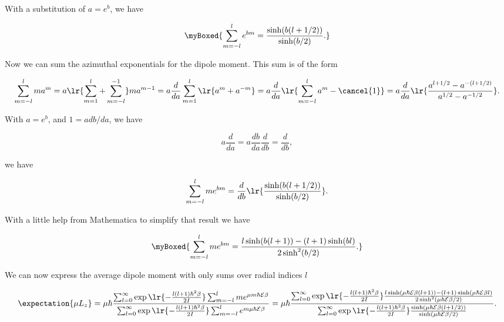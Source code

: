 {With a substitution of $a = e^b$, we have

\begin{equation}\label{eqn:basicStatMechProblemSet5Problem3:440}
\myBoxed{
\sum_{m = -l}^l e^{b m}
=
\frac{
\sinh(b(l + 1/2))
}
{
\sinh(b/2)
}.
}
\end{equation}

Now we can sum the azimuthal exponentials for the dipole moment.  This sum is of the form

\begin{dmath}\label{eqn:basicStatMechProblemSet5Problem3:460}
\sum_{m = -l}^l m a^m
= a 
\lr{ \sum_{m = 1}^l + \sum_{m = -l}^{-1} }
m a^{m-1}
= a 
\frac{d}{da}
\sum_{m = 1}^l
\lr{ a^{m} + a^{-m} }
= 
a 
\frac{d}{da}
\lr{ \sum_{m = -l}^l a^m - \cancel{1} }
= 
a 
\frac{d}{da}
\lr{ \frac{a^{l + 1/2} - a^{-(l+1/2)}}{a^{1/2} - a^{-1/2}} }.
\end{dmath}

With $a = e^{b}$, and $1 = a db/da$, we have

\begin{equation}\label{eqn:basicStatMechProblemSet5Problem3:480}
a \frac{d}{da} = a \frac{db}{da} \frac{d}{db} = \frac{d}{db},
\end{equation}

we have

\begin{equation}\label{eqn:basicStatMechProblemSet5Problem3:500}
\sum_{m = -l}^l m e^{b m}
= \frac{d}{db}
\lr{
\frac{
\sinh(b(l + 1/2))
}{
\sinh(b/2)
}
}.
\end{equation}

With a little help from Mathematica to simplify that result we have

\begin{equation}\label{eqn:basicStatMechProblemSet5Problem3:520}
\myBoxed{
\sum_{m = -l}^l m e^{b m}
=
\frac
{
l \sinh(b (l+1)) - (l+1) \sinh(b l) 
}
{
2 \sinh^2(b/2)
}
.
}
\end{equation}

We can now express the average dipole moment with only sums over radial indices $l$ 

\begin{dmath}\label{eqn:basicStatMechProblemSet5Problem3:540}
\expectation{ \mu L_z } 
= 
\mu \hbar 
\frac{
   \sum_{l = 0}^\infty \exp\lr{ -\frac{l (l+1) \hbar^2 \beta}{2 I}}
   \sum_{m = -l}^l m e^{ \mu m \hbar \mathcal{E} \beta}
}
{
   \sum_{l = 0}^\infty \exp\lr{ -\frac{l (l+1) \hbar^2 \beta}{2 I}} 
   \sum_{m = -l}^l e^{ m \mu \hbar \mathcal{E} \beta}
}
=
\mu \hbar
\frac
{
   \sum_{l = 0}^\infty \exp\lr{ -\frac{l (l+1) \hbar^2 \beta}{2 I}}
   \frac
   {
      l \sinh(\mu \hbar \mathcal{E} \beta (l+1)) - (l+1) \sinh(\mu \hbar \mathcal{E} \beta l) 
   }
   {
      2 \sinh^2(\mu \hbar \mathcal{E} \beta/2)
   }
}
{
\sum_{l = 0}^\infty \exp\lr{ -\frac{l (l+1) \hbar^2 \beta}{2 I}} 
   \frac
   {
      \sinh(\mu \hbar \mathcal{E} \beta(l + 1/2))
   }
   {
      \sinh(\mu \hbar \mathcal{E} \beta/2)
   }
}.
\end{dmath}

}
